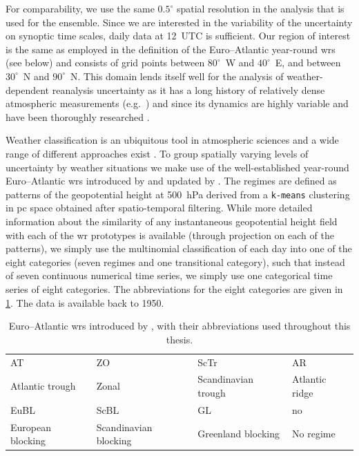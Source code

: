 For comparability, we use the same $0.5^\circ$ spatial resolution in the analysis that is used for the ensemble. Since we are interested in the variability of the uncertainty on synoptic time scales, daily data at 12~UTC is sufficient. Our region of interest is the same as employed in the definition of the Euro--Atlantic year-round \glspl{wr} (see below) and consists of grid points between $80^\circ$~W and $40^\circ$~E, and between  $30^\circ$~N and $90^\circ$~N. This domain lends itself well for the analysis of weather-dependent reanalysis uncertainty as it has a long history of relatively dense atmospheric measurements (e.g.~\cite{sociERA5GlobalReanalysis2024}) and since its dynamics are highly variable and have been thoroughly researched \parencite{woollingsDynamicalInfluencesEuropean2010}.

Weather classification is an ubiquitous tool in atmospheric sciences and a wide range of different approaches exist \parencite{hannachiLowFrequencyNonlinearity2017}. To group spatially varying levels of uncertainty by weather situations we make use of the well-established year-round Euro--Atlantic \glspl{wr} introduced by \textcite{gramsBalancingEuropesWindpower2017} and updated by \textcite{hauserLifeCycleDynamics2024, gramsLifeCycleDefinition2026}. The regimes are defined as patterns of the geopotential height at 500~hPa derived from a \texttt{k-means} clustering in \gls{pc} space obtained after spatio-temporal filtering. While more detailed information about the similarity of any instantaneous geopotential height field with each of the \gls{wr} prototypes is available (through projection on each of the patterns), we simply use the multinomial classification of each day into one of the eight categories (seven regimes and one transitional category), such that instead of seven continuous numerical time series, we simply use one categorical time series of eight categories. The abbreviations for the eight categories are given in \cref{tab:weather_regimes}. The data is available back to 1950.

\begin{table}[ht]
    \centering
    \begin{tabular}{llll}
        \toprule
        AT                & ZO                    & ScTr                & AR             \\
        Atlantic trough   & Zonal                 & Scandinavian trough & Atlantic ridge \\
        \midrule
        EuBL              & ScBL                  & GL                  & no             \\
        European blocking & Scandinavian blocking & Greenland blocking  & No regime      \\
        \bottomrule
    \end{tabular}
    \caption{Euro--Atlantic \glspl{wr} introduced by \textcite{gramsBalancingEuropesWindpower2017},
        with their abbreviations used throughout this thesis.}
    \label{tab:weather_regimes}
\end{table}

